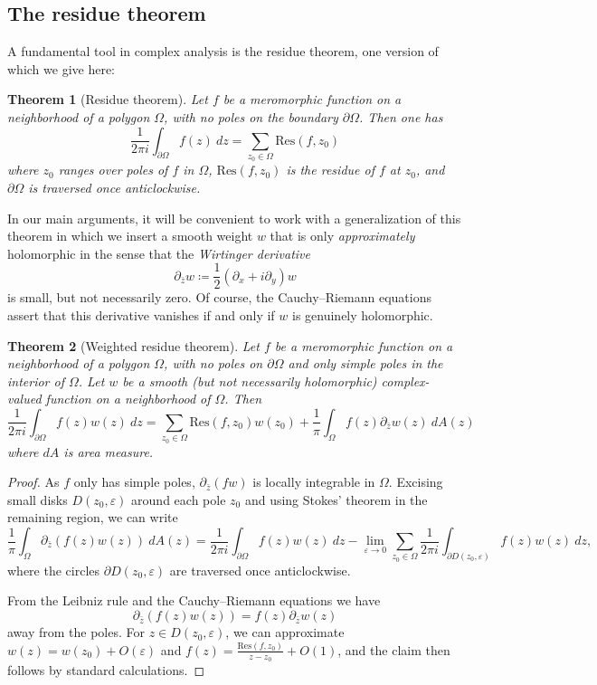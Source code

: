 \documentclass[12pt]{amsart}
\newtheorem{theorem}{Theorem}[section]
\newcommand{\eps}{\varepsilon}
\begin{document}
\subsection{The residue theorem}

A fundamental tool in complex analysis is the residue theorem, one version of which we give here:

\begin{theorem}[Residue theorem]\label{residue}  Let $f$ be a meromorphic function on a neighborhood of a polygon $\Omega$, with no poles on the boundary $\partial \Omega$.  Then one has
    $$ \frac{1}{2\pi i} \int_{\partial \Omega} f(z)\ dz = \sum_{z_0 \in \Omega} \mathrm{Res}(f, z_0)$$
where $z_0$ ranges over poles of $f$ in $\Omega$, $\mathrm{Res}(f, z_0)$ is the residue of $f$ at $z_0$, and $\partial \Omega$ is traversed once anticlockwise.
\end{theorem}

In our main arguments, it will be convenient to work with a generalization of this theorem in which we insert a smooth weight $w$ that is only \emph{approximately} holomorphic in the sense that the \emph{Wirtinger derivative}
$$ \partial_{\bar z} w \coloneqq \frac{1}{2} \left( \partial_x + i \partial_y \right) w$$
is small, but not necessarily zero.  Of course, the Cauchy--Riemann equations assert that this derivative vanishes if and only if $w$ is genuinely holomorphic.

\begin{theorem}[Weighted residue theorem]\label{residue-weight}  Let $f$ be a meromorphic function on a neighborhood of a polygon $\Omega$, with no poles on $\partial \Omega$ and only simple poles in the interior of $\Omega$.  Let $w$ be a smooth (but not necessarily holomorphic) complex-valued function on a neighborhood of $\Omega$.  Then
    $$ \frac{1}{2\pi i} \int_{\partial \Omega} f(z) w(z)\ dz = \sum_{z_0 \in \Omega} \mathrm{Res}(f, z_0) w(z_0) + \frac{1}{\pi} \int_\Omega f(z) \partial_{\bar z} w(z)\ dA(z)$$
where $dA$ is area measure.
\end{theorem}

\begin{proof}  As $f$ only has simple poles, $\partial_{\bar z} (fw)$ is locally integrable in $\Omega$.  Excising small disks $D(z_0,\eps)$ around each pole $z_0$ and using Stokes' theorem in the remaining region, we can write
$$ \frac{1}{\pi} \int_\Omega \partial_{\bar z} (f(z) w(z))\ dA(z) = \frac{1}{2\pi i} \int_{\partial \Omega} f(z) w(z)\ dz - \lim_{\eps \to 0} \sum_{z_0 \in\Omega} \frac{1}{2\pi i} \int_{\partial D(z_0,\eps)}  f(z) w(z)\ dz,$$
where the circles $\partial D(z_0,\eps)$ are traversed once anticlockwise.

From the Leibniz rule and the Cauchy--Riemann equations we have
$$ \partial_{\bar z} (f(z) w(z)) = f(z) \partial_{\bar z} w(z)$$
away from the poles. For $z \in D(z_0,\eps)$, we can approximate $w(z) = w(z_0) + O(\eps)$ and $f(z) = \frac{\mathrm{Res}(f,z_0)}{z-z_0} + O(1)$, and the claim then follows by standard calculations.
\end{proof}
\end{document}
